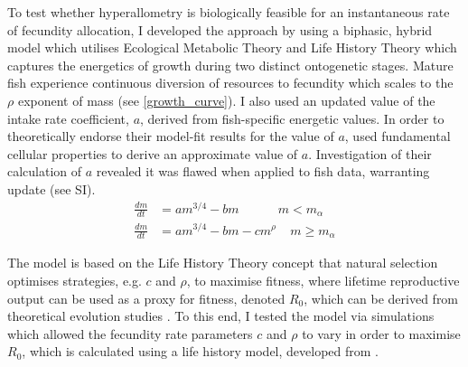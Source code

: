 \documentclass[a4paper]{article} %
\begin{document}
To test whether hyperallometry is biologically feasible for an instantaneous rate of fecundity allocation, I developed the \textcite{Charnov2001} approach by using a biphasic, hybrid model which utilises Ecological Metabolic Theory and Life History Theory which captures the energetics of growth during two distinct ontogenetic stages. Mature fish experience continuous diversion of resources to fecundity which scales to the $\rho$ exponent of mass (see \cref{growth_curve}). I also used an updated value of the intake rate coefficient, $a$, derived from fish-specific energetic values. In order to theoretically endorse their model-fit results for the value of $a$, \textcite{West2001} used fundamental cellular properties to derive an approximate value of $a$. Investigation of their calculation of $a$ revealed it was flawed when applied to fish data, warranting update (see SI).
\begin{align}
    \frac{dm}{dt} &= am^{3/4} - bm \ \ \ \ \ \ \ \ \ \ \ \ \ \ m < m_{\alpha} \label{luke_model_juvenile}\\
    \frac{dm}{dt} &= am^{3/4} - bm - cm^{\rho} \ \ \ \ \ m \geq m_{\alpha} \label{luke_model}
\end{align}

The model is based on the Life History Theory concept that natural selection optimises strategies, e.g. $c$ and $\rho$, to maximise fitness, where lifetime reproductive output can be used as a proxy for fitness, denoted $R_0$, which can be derived from theoretical evolution studies \autocite{Charnov2001, stearns1992evolution}. To this end, I tested the model via simulations which allowed the fecundity rate parameters $c$ and $\rho$ to vary in order to maximise $R_0$, which is calculated using a life history model, developed from \textcite{Charnov2001}.
\end{document}
